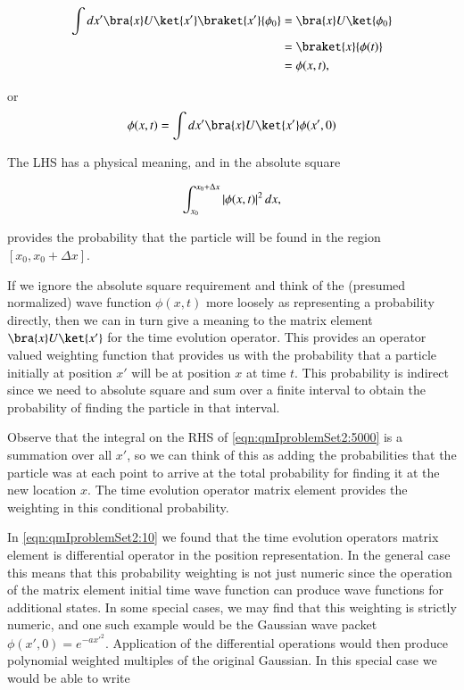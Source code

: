 \begin{align*}
\int dx' \bra{x} U \ket{x'} \braket{x'}{\phi_0} 
&=
\bra{x} U \ket{\phi_0} \\
&=
\braket{x}{\phi(t)} \\
&=
\phi(x,t),
\end{align*}

or
\begin{align*}
\phi(x,t) = \int dx' \bra{x} U \ket{x'} \phi(x',0)
\end{align*}

The LHS has a physical meaning, and in the absolute square

\begin{align}\label{eqn:qmIproblemSet2:5000}
\int_{x_0}^{x_0+ \Delta x} \left\lvert{\phi(x,t)}\right\rvert^2 dx,
\end{align}

provides the probability that the particle will be found in the region $[x_0, x_0+ \Delta x]$.  

If we ignore the absolute square requirement and think of the (presumed normalized) wave function $\phi(x,t)$ more loosely as representing a probability directly, then we can in turn give a meaning to the matrix element $\bra{x} U \ket{x'}$ for the time evolution operator.  This provides an operator valued weighting function that provides us with the probability that a particle initially at position $x'$ will be at position $x$ at time $t$.  This probability is indirect since we need to absolute square and sum over a finite interval to obtain the probability of finding the particle in that interval.

Observe that the integral on the RHS of \ref{eqn:qmIproblemSet2:5000} is a summation over all $x'$, so we can think of this as adding the probabilities that the particle was at each point to arrive at the total probability for finding it at the new location $x$.  The time evolution operator matrix element provides the weighting in this conditional probability.

In \ref{eqn:qmIproblemSet2:10} we found that the time evolution operators matrix element is differential operator in the position representation.  In the general case this means that this probability weighting is not just numeric since the operation of the matrix element initial time wave function can produce wave functions for additional states.  In some special cases, we may find that this weighting is strictly numeric, and one such example would be the Gaussian wave packet $\phi(x',0) = e^{-a{x'}^2}$.  Application of the differential operations would then produce polynomial weighted multiples of the original Gaussian.  In this special case we would be able to write

